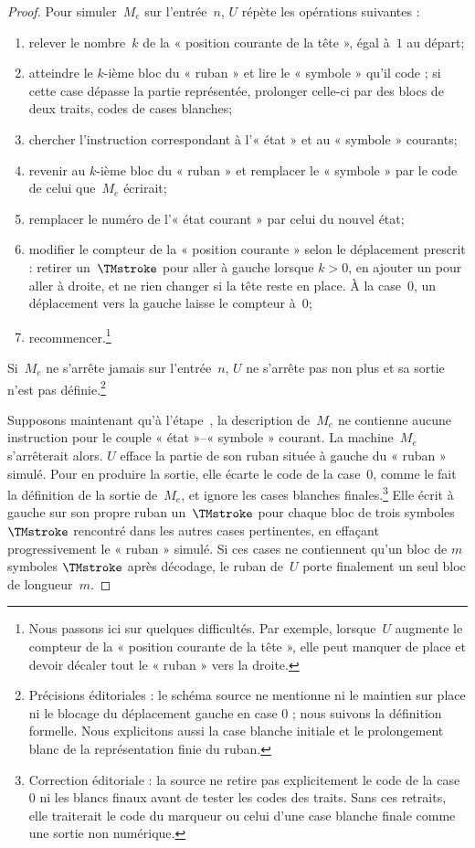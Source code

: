 \documentclass[../../../include/open-logic-section]{subfiles}
\begin{document}
\begin{proof}
Pour simuler~$M_e$ sur l'entrée~$n$, $U$ répète les opérations
suivantes :
\begin{enumerate}
\item relever le nombre~$k$ de la « position courante de la tête »,
  égal à~$1$ au départ;
\item atteindre le $k$-ième bloc du « ruban » et lire le
  « symbole » qu'il code ; si cette case dépasse la partie représentée, prolonger celle-ci par des blocs de deux traits, codes de cases blanches;
\item{}%
  chercher l'instruction correspondant à l'« état » et au
  « symbole » courants;
\item revenir au $k$-ième bloc du « ruban » et remplacer le
  « symbole » par le code de celui que~$M_e$ écrirait;
\item remplacer le numéro de l'« état courant » par celui du
  nouvel état;
\item modifier le compteur de la « position courante » selon
  le déplacement prescrit : retirer un~$\TMstroke$ pour aller
  à gauche lorsque $k>0$, en ajouter un pour aller à droite,
  et ne rien changer si la tête reste en place. À la case~$0$,
  un déplacement vers la gauche laisse le compteur à~$0$;
\item recommencer.\footnote{Nous passons ici sur quelques
  difficultés. Par exemple, lorsque~$U$ augmente le compteur de
  la « position courante de la tête », elle peut manquer de place
  et devoir décaler tout le « ruban » vers la droite.}
\end{enumerate}
Si~$M_e$ ne s'arrête jamais sur l'entrée~$n$, $U$ ne s'arrête
pas non plus et sa sortie n'est pas définie.\footnote{Précisions éditoriales : le schéma source ne mentionne ni le maintien sur place ni le blocage du déplacement gauche en case $0$ ; nous suivons la définition formelle. Nous explicitons aussi la case blanche initiale et le prolongement blanc de la représentation finie du ruban.}

Supposons maintenant qu'à l'étape~, la description
de~$M_e$ ne contienne aucune instruction pour le couple
« état »--« symbole » courant. La machine~$M_e$ s'arrêterait
alors. $U$ efface la partie de son ruban située à gauche du
« ruban » simulé. Pour en produire la sortie, elle écarte le
code de la case~$0$, comme le fait la définition de la sortie
de~$M_e$, et ignore les cases blanches finales.\footnote{Correction éditoriale : la source ne retire pas explicitement le code de la case $0$ ni les blancs finaux avant de tester les codes des traits. Sans ces retraits, elle traiterait le code du marqueur ou celui d'une case blanche finale comme une sortie non numérique.} Elle écrit à
gauche sur son propre ruban un~$\TMstroke$ pour chaque bloc de
trois symboles~$\TMstroke$ rencontré dans les autres cases
pertinentes, en effaçant progressivement le « ruban » simulé.
Si ces cases ne contiennent qu'un bloc de $m$ symboles
$\TMstroke$ après décodage, le ruban de~$U$ porte finalement
un seul bloc de longueur~$m$.


\end{proof}
\end{document}
